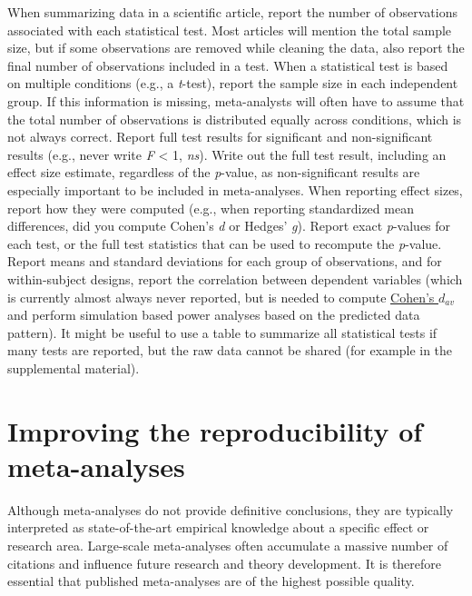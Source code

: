 \documentclass[
  oneside]{krantz}
\begin{document}
When summarizing data in a scientific article, report the number of observations associated with each statistical test. Most articles will mention the total sample size, but if some observations are removed while cleaning the data, also report the final number of observations included in a test. When a statistical test is based on multiple conditions (e.g., a \emph{t}-test), report the sample size in each independent group. If this information is missing, meta-analysts will often have to assume that the total number of observations is distributed equally across conditions, which is not always correct. Report full test results for significant and non-significant results (e.g., never write \emph{F} \textless{} 1, \emph{ns}). Write out the full test result, including an effect size estimate, regardless of the \emph{p}-value, as non-significant results are especially important to be included in meta-analyses. When reporting effect sizes, report how they were computed (e.g., when reporting standardized mean differences, did you compute Cohen's \emph{d} or Hedges' \emph{g}). Report exact \emph{p}-values for each test, or the full test statistics that can be used to recompute the \emph{p}-value. Report means and standard deviations for each group of observations, and for within-subject designs, report the correlation between dependent variables (which is currently almost always never reported, but is needed to compute \protect\hyperlink{cohend}{Cohen's \(d_{av}\)} and perform simulation based power analyses based on the predicted data pattern). It might be useful to use a table to summarize all statistical tests if many tests are reported, but the raw data cannot be shared (for example in the supplemental material).

\hypertarget{metareporting}{%
\section{Improving the reproducibility of meta-analyses}\label{metareporting}}

Although meta-analyses do not provide definitive conclusions, they are typically interpreted as state-of-the-art empirical knowledge about a specific effect or research area. Large-scale meta-analyses often accumulate a massive number of citations and influence future research and theory development. It is therefore essential that published meta-analyses are of the highest possible quality.
\end{document}
